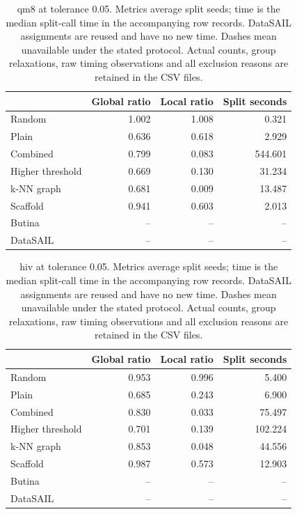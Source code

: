 \begin{table}[htbp]\centering\small
\begin{tabular}{lrrr}
\toprule
 & Global ratio & Local ratio & Split seconds \\
\midrule
Random & 1.002 & 1.008 & 0.321 \\
Plain & 0.636 & 0.618 & 2.929 \\
Combined & 0.799 & 0.083 & 544.601 \\
Higher threshold & 0.669 & 0.130 & 31.234 \\
k-NN graph & 0.681 & 0.009 & 13.487 \\
Scaffold & 0.941 & 0.603 & 2.013 \\
Butina & -- & -- & -- \\
DataSAIL & -- & -- & -- \\
\bottomrule
\end{tabular}

\caption{qm8 at tolerance 0.05. Metrics average split seeds; time is the median split-call time in the accompanying row records. DataSAIL assignments are reused and have no new time. Dashes mean unavailable under the stated protocol. Actual counts, group relaxations, raw timing observations and all exclusion reasons are retained in the CSV files.}\end{table}
\begin{table}[htbp]\centering\small
\begin{tabular}{lrrr}
\toprule
 & Global ratio & Local ratio & Split seconds \\
\midrule
Random & 0.953 & 0.996 & 5.400 \\
Plain & 0.685 & 0.243 & 6.900 \\
Combined & 0.830 & 0.033 & 75.497 \\
Higher threshold & 0.701 & 0.139 & 102.224 \\
k-NN graph & 0.853 & 0.048 & 44.556 \\
Scaffold & 0.987 & 0.573 & 12.903 \\
Butina & -- & -- & -- \\
DataSAIL & -- & -- & -- \\
\bottomrule
\end{tabular}

\caption{hiv at tolerance 0.05. Metrics average split seeds; time is the median split-call time in the accompanying row records. DataSAIL assignments are reused and have no new time. Dashes mean unavailable under the stated protocol. Actual counts, group relaxations, raw timing observations and all exclusion reasons are retained in the CSV files.}\end{table}
